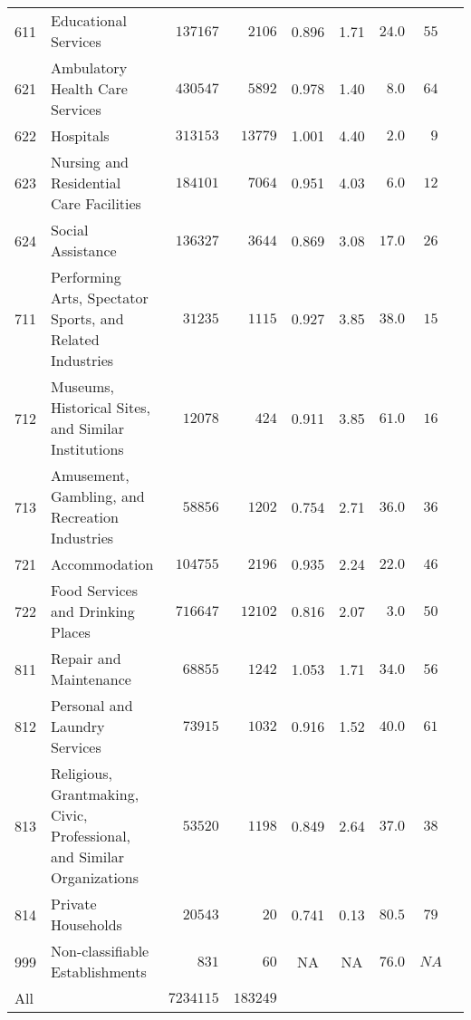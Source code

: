 \documentclass[9pt, oneside]{article}   	%
\begin{document}
\begin{longtable}{lp{3 in}ccccccc}
611  & Educational Services & $\phantom{0}137167$ & $\phantom{00}2106$ & 0.896 &  1.71 & $24.0$ & $55$ \\
621  & Ambulatory Health Care Services & $\phantom{0}430547$ & $\phantom{00}5892$ & 0.978 &  1.40 & $\phantom{0}8.0$ & $64$ \\
622  & Hospitals & $\phantom{0}313153$ & $\phantom{0}13779$ & 1.001 &  4.40 & $\phantom{0}2.0$ & $\phantom{0}9$ \\
623  & Nursing and Residential Care Facilities & $\phantom{0}184101$ & $\phantom{00}7064$ & 0.951 &  4.03 & $\phantom{0}6.0$ & $12$ \\
624  & Social Assistance & $\phantom{0}136327$ & $\phantom{00}3644$ & 0.869 &  3.08 & $17.0$ & $26$ \\
711  & Performing Arts, Spectator Sports, and Related Industries & $\phantom{00}31235$ & $\phantom{00}1115$ & 0.927 &  3.85 & $38.0$ & $15$ \\
712  & Museums, Historical Sites, and Similar Institutions & $\phantom{00}12078$ & $\phantom{000}424$ & 0.911 &  3.85 & $61.0$ & $16$ \\
713  & Amusement, Gambling, and Recreation Industries & $\phantom{00}58856$ & $\phantom{00}1202$ & 0.754 &  2.71 & $36.0$ & $36$ \\
721  & Accommodation & $\phantom{0}104755$ & $\phantom{00}2196$ & 0.935 &  2.24 & $22.0$ & $46$ \\
722  & Food Services and Drinking Places & $\phantom{0}716647$ & $\phantom{0}12102$ & 0.816 &  2.07 & $\phantom{0}3.0$ & $50$ \\
811  & Repair and Maintenance & $\phantom{00}68855$ & $\phantom{00}1242$ & 1.053 &  1.71 & $34.0$ & $56$ \\
812  & Personal and Laundry Services & $\phantom{00}73915$ & $\phantom{00}1032$ & 0.916 &  1.52 & $40.0$ & $61$ \\
813  & Religious, Grantmaking, Civic, Professional, and Similar Organizations & $\phantom{00}53520$ & $\phantom{00}1198$ & 0.849 &  2.64 & $37.0$ & $38$ \\
814  & Private Households & $\phantom{00}20543$ & $\phantom{0000}20$ & 0.741 &  0.13 & $80.5$ & $79$ \\
999  & Non-classifiable Establishments & $\phantom{0000}831$ & $\phantom{0000}60$ &    NA &    NA & $76.0$ & $NA$ \\
\cline{1-1} \cline{2-2} \cline{3-3} \cline{4-4} \cline{5-5} \cline{6-6} \cline{7-7} \cline{8-8} %
All  &  & $7234115$ & $183249$ &  &   &  &  \\
\hline 
\end{longtable}
\end{document}
